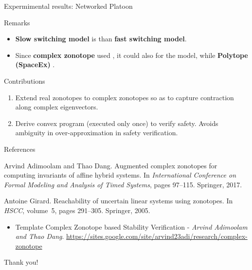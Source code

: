 \begin{frame}{Expermimental results: Networked Platoon}
\begin{table}
{\small
\begin{alertblock}{Remarks}
\begin{itemize}
\item {\bf Slow switching model} is  than {\bf fast switching model}.
\item Since {\bf complex zonotope} used , it could also  for the  model, while  {\bf Polytope (SpaceEx)} .
\end{itemize}
\end{alertblock}
}
\end{table}
\end{frame}

\begin{frame}{Contributions}
\begin{enumerate}
\item Extend {\color{blue} real zonotopes to complex zonotopes} so as to capture
{\color{blue} contraction along complex eigenvectors}.
\item Derive {\color{blue} convex program} {\color{purple}(executed only
once)} to verify safety.  {\color{blue} Avoids ambiguity in
over-approximation} in safety verification.
\end{enumerate}
\end{frame}

\begin{frame}{References}

\begin{thebibliography}{1}

Arvind Adimoolam and Thao Dang.
\newblock Augmented complex zonotopes for computing invariants of affine hybrid
  systems.
\newblock In {\em International Conference on Formal Modeling and Analysis of
  Timed Systems}, pages 97--115. Springer, 2017.

Antoine Girard.
\newblock Reachability of uncertain linear systems using zonotopes.
\newblock In {\em HSCC}, volume~5, pages 291--305. Springer, 2005.

\end{thebibliography}


\begin{itemize}
\item Template Complex Zonotope based Stability Verification - {\it Arvind
Adimoolam and Thao Dang}. \url{https://sites.google.com/site/arvind23adi/research/complex-zonotope}
\end{itemize}
\end{frame}


\begin{frame}{}
\center
{\Huge {\color{blue} Thank you!}}
\end{frame}




















